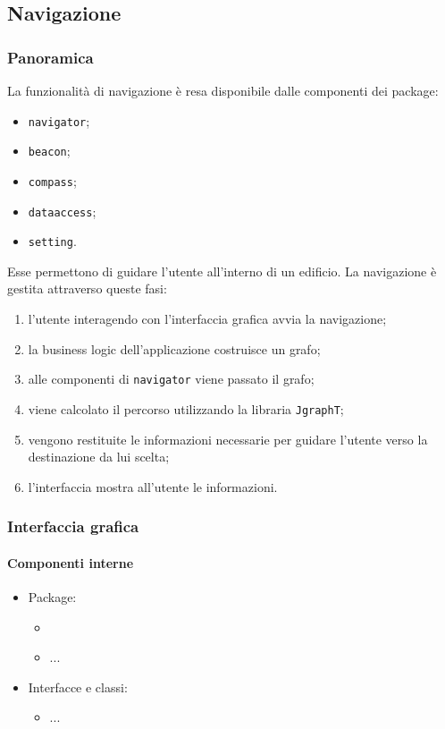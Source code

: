 \documentclass[../Funzionalita.tex]{subfiles}
\begin{document}
\subsection{Navigazione}
\label{subsec:Navigazione}

		\subsubsection{Panoramica}
			La funzionalità di navigazione è resa disponibile dalle componenti dei package:
			\begin{itemize}
				\item \verb|navigator|;
				\item \verb|beacon|;
				\item \verb|compass|;
				\item \verb|dataaccess|;
				\item \verb|setting|.
			\end{itemize}
			Esse permettono di guidare l'utente all'interno di un edificio.
			La navigazione è gestita attraverso queste fasi:
			\begin{enumerate}
				\item l'utente interagendo con l'interfaccia grafica avvia la navigazione;
				\item la business logic dell'applicazione costruisce un grafo;
				\item alle componenti di \verb|navigator| viene passato il grafo;
				\item viene calcolato il percorso utilizzando la libraria \verb|JgraphT|;
				\item vengono restituite le informazioni necessarie per guidare l'utente verso la destinazione da lui scelta;
				\item l'interfaccia mostra all'utente le informazioni.
			\end{enumerate}
			
		\subsubsection{Interfaccia grafica}
			
			\paragraph*{Componenti interne}
			\begin{itemize}
			
				\item Package:
				\begin{itemize}
					\item[]
					\item[] ...
				\end{itemize}
				
				\item Interfacce e classi:
				\begin{itemize}
					\item[] ...
				\end{itemize}
				
			\end{itemize}
			
\end{document}
